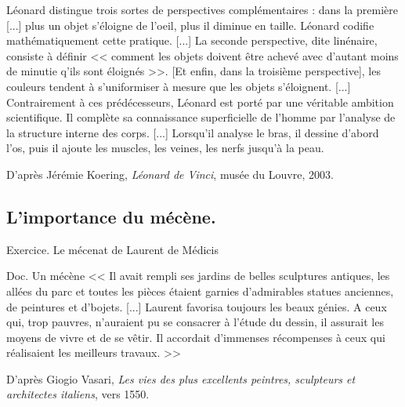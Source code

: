 \documentclass{beamer}
\begin{document}
\begin{frame}
\begin{beamerboxesrounded}[scheme=blocimage]{}
Léonard distingue trois sortes de perspectives complémentaires : dans la première [...] plus un objet s'éloigne de l'oeil, plus il diminue en taille. Léonard codifie mathématiquement cette pratique. [...] La seconde perspective, dite linénaire, consiste à définir << comment les objets doivent être achevé avec d'autant moins de minutie q'ils sont éloignés >>. [Et enfin, dans la troisième perspective], les couleurs tendent à s'uniformiser à mesure que les objets s'éloignent. 
[...] \\
Contrairement à ces prédécesseurs, Léonard est porté par une véritable ambition scientifique. Il complète sa connaissance superficielle de l'homme par l'analyse de la structure interne des corps. [...] Lorsqu'il analyse le bras, il dessine d'abord l'os, puis il ajoute les muscles, les veines, les nerfs jusqu'à la peau.
\begin{flushright}
D'après Jérémie Koering, \textit{Léonard de Vinci}, musée du Louvre, 2003.
\end{flushright}
\end{beamerboxesrounded}
\end{frame}

\subsection{L'importance du mécène.}

\begin{frame}{Exercice. Le mécenat de Laurent de Médicis}
\begin{beamerboxesrounded}[scheme=blocimage]{Doc. Un mécène}
<< Il avait rempli ses jardins de belles sculptures antiques, les allées du parc et toutes les pièces étaient garnies d'admirables statues anciennes, de peintures et d'bojets. [...]
Laurent favorisa toujours les beaux génies. A ceux qui, trop pauvres, n'auraient pu se consacrer à l'étude du dessin, il assurait les moyens de vivre et de se vêtir. Il accordait d'immenses récompenses à ceux qui réalisaient les meilleurs travaux. >>
\begin{flushright}
D'après Giogio Vasari, \textit{Les vies des plus excellents peintres, sculpteurs et architectes italiens}, vers 1550.
\end{flushright}
\end{beamerboxesrounded}
\end{frame}
\end{document}

